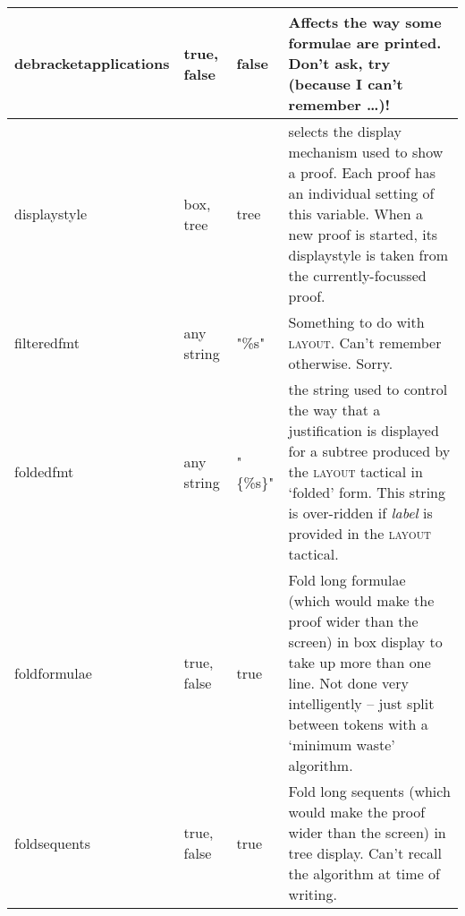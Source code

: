 \begin{longtable}{|l|p{2cm}|l|p{2.5in}|}
{\raggedright debracketapplications} & {\raggedright true, false} & {\raggedright false} & {\raggedright Affects the way some formulae are printed. Don't ask, try (because I can't remember \dots)!}\\
\hline


{\raggedright displaystyle} & {\raggedright box, tree} & {\raggedright tree} & {\raggedright selects the display mechanism used to show a proof. Each proof has an individual setting of this variable. When a new proof is started, its displaystyle is taken from the currently-focussed proof.}\\
\hline

filteredfmt & any string & "\%s" & Something to do with \textsc{layout}. Can't remember otherwise. Sorry.\\ \hline

{\raggedright foldedfmt} & {\raggedright any string} & {\raggedright "\{\%s\}"} & {\raggedright the string used to control the way that a justification is displayed for a subtree produced by the \textsc{layout} tactical in `folded' form. This string is over-ridden if \textit{label} is provided in the \textsc{layout} tactical.}\\
\hline

foldformulae & true, false & true & Fold long formulae (which would make the proof wider than the screen) in box display to take up more than one line. Not done very intelligently -- just split between tokens with a `minimum waste' algorithm.\\ \hline

foldsequents & true, false & true & Fold long sequents (which would make the proof wider than the screen) in tree display. Can't recall the algorithm at time of writing.\\ \hline



\end{longtable}
